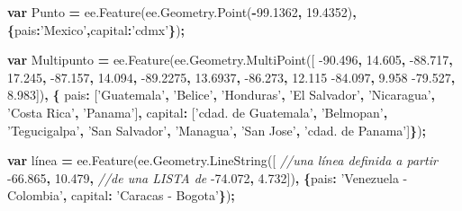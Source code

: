 \documentclass[
]{article}
\newenvironment{Shaded}{\begin{snugshade}}{\end{snugshade}}
\newcommand{\AttributeTok}[1]{\textcolor[rgb]{0.77,0.63,0.00}{#1}}
\newcommand{\CommentTok}[1]{\textcolor[rgb]{0.56,0.35,0.01}{\textit{#1}}}
\newcommand{\DataTypeTok}[1]{\textcolor[rgb]{0.13,0.29,0.53}{#1}}
\newcommand{\FloatTok}[1]{\textcolor[rgb]{0.00,0.00,0.81}{#1}}
\newcommand{\KeywordTok}[1]{\textcolor[rgb]{0.13,0.29,0.53}{\textbf{#1}}}
\newcommand{\NormalTok}[1]{#1}
\newcommand{\OperatorTok}[1]{\textcolor[rgb]{0.81,0.36,0.00}{\textbf{#1}}}
\newcommand{\StringTok}[1]{\textcolor[rgb]{0.31,0.60,0.02}{#1}}
\newcommand{\VariableTok}[1]{\textcolor[rgb]{0.00,0.00,0.00}{#1}}
\begin{document}
\begin{Shaded}
\begin{Highlighting}[]
\KeywordTok{var}\NormalTok{ Punto }\OperatorTok{=} \VariableTok{ee}\NormalTok{.}\AttributeTok{Feature}\NormalTok{(}\VariableTok{ee}\NormalTok{.}\VariableTok{Geometry}\NormalTok{.}\AttributeTok{Point}\NormalTok{(}\OperatorTok{-}\FloatTok{99.1362}\OperatorTok{,} \FloatTok{19.4352}\NormalTok{)}\OperatorTok{,}
    \OperatorTok{\{}\DataTypeTok{pais}\OperatorTok{:}\StringTok{'Mexico'}\OperatorTok{,}\DataTypeTok{capital}\OperatorTok{:}\StringTok{'cdmx'}\OperatorTok{\}}\NormalTok{)}\OperatorTok{;}

\KeywordTok{var}\NormalTok{ Multipunto }\OperatorTok{=} \VariableTok{ee}\NormalTok{.}\AttributeTok{Feature}\NormalTok{(}\VariableTok{ee}\NormalTok{.}\VariableTok{Geometry}\NormalTok{.}\AttributeTok{MultiPoint}\NormalTok{([     }
    \FloatTok{-90.496}\OperatorTok{,} \FloatTok{14.605}\OperatorTok{,}                               
    \FloatTok{-88.717}\OperatorTok{,} \FloatTok{17.245}\OperatorTok{,}                              
    \FloatTok{-87.157}\OperatorTok{,} \FloatTok{14.094}\OperatorTok{,}
    \FloatTok{-89.2275}\OperatorTok{,} \FloatTok{13.6937}\OperatorTok{,}
    \FloatTok{-86.273}\OperatorTok{,} \FloatTok{12.115}
    \FloatTok{-84.097}\OperatorTok{,} \FloatTok{9.958}
    \FloatTok{-79.527}\OperatorTok{,} \FloatTok{8.983}\NormalTok{])}\OperatorTok{,}
    \OperatorTok{\{} \DataTypeTok{pais}\OperatorTok{:} 
\NormalTok{      [}\StringTok{'Guatemala'}\OperatorTok{,} 
      \StringTok{'Belice'}\OperatorTok{,} 
      \StringTok{'Honduras'}\OperatorTok{,} 
      \StringTok{'El Salvador'}\OperatorTok{,} 
      \StringTok{'Nicaragua'}\OperatorTok{,} 
      \StringTok{'Costa Rica'}\OperatorTok{,} 
      \StringTok{'Panama'}\NormalTok{]}\OperatorTok{,}
      \DataTypeTok{capital}\OperatorTok{:} 
\NormalTok{      [}\StringTok{'cdad. de Guatemala'}\OperatorTok{,} 
      \StringTok{'Belmopan'}\OperatorTok{,} 
      \StringTok{'Tegucigalpa'}\OperatorTok{,} 
      \StringTok{'San Salvador'}\OperatorTok{,} 
      \StringTok{'Managua'}\OperatorTok{,} 
      \StringTok{'San Jose'}\OperatorTok{,} 
      \StringTok{'cdad. de Panama'}\NormalTok{]}\OperatorTok{\}}\NormalTok{)}\OperatorTok{;}

\KeywordTok{var}\NormalTok{ línea }\OperatorTok{=} \VariableTok{ee}\NormalTok{.}\AttributeTok{Feature}\NormalTok{(}\VariableTok{ee}\NormalTok{.}\VariableTok{Geometry}\NormalTok{.}\AttributeTok{LineString}\NormalTok{([  }\CommentTok{//una línea definida a partir}
  \FloatTok{-66.865}\OperatorTok{,} \FloatTok{10.479}\OperatorTok{,}                     \CommentTok{//de una LISTA de}
  \FloatTok{-74.072}\OperatorTok{,} \FloatTok{4.732}\NormalTok{])}\OperatorTok{,}
    \OperatorTok{\{}\DataTypeTok{pais}\OperatorTok{:} \StringTok{'Venezuela - Colombia'}\OperatorTok{,} \DataTypeTok{capital}\OperatorTok{:} \StringTok{'Caracas - Bogota'}\OperatorTok{\}}\NormalTok{)}\OperatorTok{;} 


\end{Highlighting}
\end{Shaded}
\end{document}
